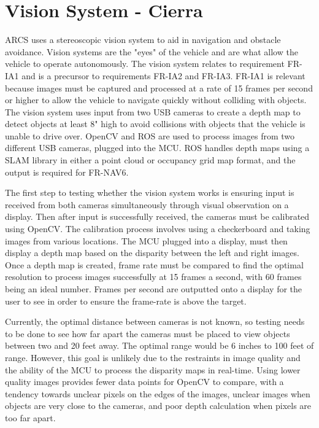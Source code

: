 \documentclass[compsoc,draftclsnofoot,onecolumn,10pt]{IEEEtran}
\begin{document}
\section{Vision System - Cierra}
ARCS uses a stereoscopic vision system to aid in navigation and obstacle avoidance. 
Vision systems are the "eyes" of the vehicle and are what allow the vehicle to operate autonomously. 
The vision system relates to requirement FR-IA1 and is a precursor to requirements FR-IA2 and FR-IA3. 
FR-IA1 is relevant because images must be captured and processed at a rate of 15 frames per second or higher to allow the vehicle to navigate quickly without colliding with objects.
The vision system uses input from two USB cameras to create a depth map to detect objects at least 8" high to avoid collisions with objects that the vehicle is unable to drive over. 
OpenCV and ROS are used to process images from two different USB cameras, plugged into the MCU.  
ROS handles depth maps using a SLAM library in either a point cloud or occupancy grid map format, and the output is required for FR-NAV6. \par
The first step to testing whether the vision system works is ensuring input is received from both cameras simultaneously through visual observation on a display. Then after input is successfully received, the cameras must be calibrated using OpenCV. The calibration process involves using a checkerboard and taking images from various locations. The MCU plugged into a display, must then display a depth map based on the disparity between the left and right images. 
Once a depth map is created, frame rate must be compared to find the optimal resolution to process images successfully at 15 frames a second, with 60 frames being an ideal number. Frames per second are outputted onto a display for the user to see in order to ensure the frame-rate is above the target. \par
Currently, the optimal distance between cameras is not known, so testing needs to be done to see how far apart the cameras must be placed to view objects between two and 20 feet away. The optimal range would be 6 inches to 100 feet of range. However, this goal is unlikely due to the restraints in image quality and the ability of the MCU to process the disparity maps in real-time. Using lower quality images provides fewer data points for OpenCV to compare, with a tendency towards unclear pixels on the edges of the images, unclear images when objects are very close to the cameras, and poor depth calculation when pixels are too far apart. \par
\end{document}
